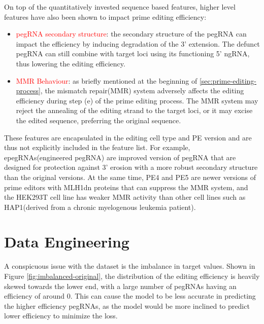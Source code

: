 On top of the quantitatively invested sequence based features, higher level features have also been shown to impact prime editing efficiency:
\begin{itemize}[itemsep=-0mm]
    \item \textcolor{red}{pegRNA secondary structure}: the secondary structure of the pegRNA can impact the efficiency by inducing degradation of the 3' extension. The defunct pegRNA can still combine with target loci using its functioning 5' ngRNA, thus lowering the editing efficiency\cite{nelsonEngineeredPegRNAsImprove2022}.
    \item \textcolor{red}{MMR Behaviour}: as briefly mentioned at the beginning of \autoref{sec:prime-editing-process}, the mismatch repair(MMR) system adversely affects the editing efficiency during step (e) of the prime editing process. The MMR system may reject the annealing of the editing strand to the target loci, or it may excise the edited sequence, preferring the original sequence\cite{chenEnhancedPrimeEditing2021}. 
\end{itemize}

These features are encapsulated in the editing cell type and PE version and are thus not explicitly included in the feature list. For example, epegRNAs(engineered pegRNA) are improved version of pegRNA that are designed for protection against 3' erosion with a more robust secondary structure than the original versions\cite{nelsonEngineeredPegRNAsImprove2022}. At the same time, PE4 and PE5 are newer versions of prime editors with MLH1dn proteins that can suppress the MMR system\cite{chenEnhancedPrimeEditing2021}, and the HEK293T cell line has weaker MMR activity than other cell lines such
as HAP1(derived from a chronic myelogenous leukemia patient)\cite{mathisPredictingPrimeEditing2023}. 

\section{Data Engineering}

A conspicuous issue with the dataset is the imbalance in target values. Shown in Figure \ref{fig:imbalanced-original}, the distribution of the editing efficiency is heavily skewed towards the lower end, with a large number of pegRNAs having an efficiency of around 0. This can cause the model to be less accurate in predicting the higher efficiency pegRNAs, as the model would be more inclined to predict lower efficiency to minimize the loss. 

